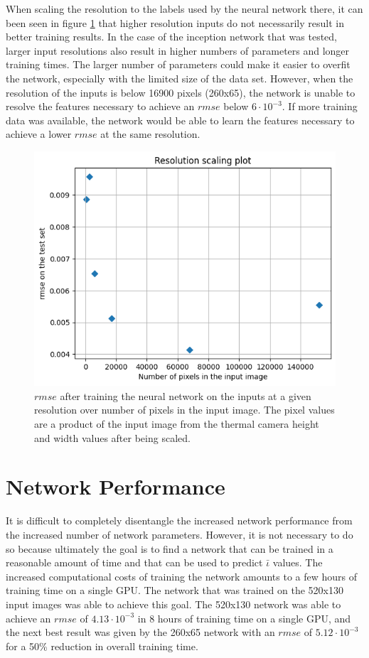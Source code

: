 When scaling the resolution to the labels used by the neural network there, it can been seen in figure \ref{fig:resolution-scaling} that higher resolution inputs do not necessarily result in better training results. In the case of the inception network that was tested, larger input resolutions also result in higher numbers of parameters and longer training times. The larger number of parameters could make it easier to overfit the network, especially with the limited size of the data set. However, when the resolution of the inputs is below 16900 pixels (260x65), the network is unable to resolve the features necessary to achieve an $rmse$ below $6 \cdot 10^{-3}$. If more training data was available, the network would be able to learn the features necessary to achieve a lower $rmse$ at the same resolution.

\begin{figure}[!htb]
    \centering
    \includegraphics[width = \textwidth]{images/resolution-scaling.png}
    \caption{$rmse$ after training the neural network on the inputs at a given resolution over number of pixels in the input image. The pixel values are a product of the input image from the thermal camera height and width values after being scaled.} \label{fig:resolution-scaling}
\end{figure}

\section{Network Performance}

It is difficult to completely disentangle the increased network performance from the increased number of network parameters. However, it is not necessary to do so because ultimately the goal is to find a network that can be trained in a reasonable amount of time and that can be used to predict $\bar{\iota}$ values. The increased computational costs of training the network amounts to a few hours of training time on a single GPU. The network that was trained on the 520x130 input images was able to achieve this goal. The 520x130 network was able to achieve an $rmse$ of $4.13 \cdot 10^{-3}$ in 8 hours of training time on a single GPU, and the next best result was given by the 260x65 network with an $rmse$ of $5.12 \cdot 10^{-3}$ for a 50\% reduction in overall training time.

